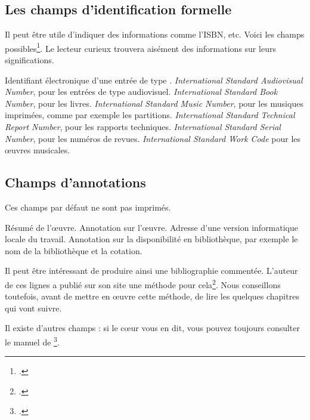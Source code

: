 \subsection{Les champs d'identification formelle}

Il peut être utile d'indiquer des informations comme l'ISBN, etc. Voici les champs possibles\footcite[Par défaut,  imprime ces champs s'ils sont remplis. Il est toutefois possible de ne pas les afficher en passant l'option  au chargement du package, voir:][]{biblatex_isbn}.  Le lecteur curieux trouvera aisément des informations sur leurs significations.

\begin{fieldlist}
	 Identifiant électronique d'une entrée de type . 
   	 \emph{\textenglish{International Standard Audiovisual Number}}, pour les entrées de type audiovisuel.
   	 \emph{\textenglish{International Standard Book Number}}, pour les livres. 
   	 \emph{\textenglish{International Standard Music Number}}, pour les musiques imprimées, comme par exemple les partitions. 
   	 \emph{\textenglish{International Standard Technical Report Number}}, pour les rapports techniques. 
   	 \emph{\textenglish{International Standard Serial Number}}, pour les numéros de revues. 
   	 \emph{\textenglish{International Standard Work Code}} pour les œuvres musicales.
\end{fieldlist}

\subsection{Champs d'annotations}

Ces champs par défaut ne sont pas imprimés. 

\begin{fieldlist}
	 Résumé de l'œuvre. 
   	 Annotation sur l'œuvre.
   	 Adresse d'une version informatique locale du travail. 
   	 Annotation sur la disponibilité en bibliothèque, par exemple  le nom de la bibliothèque et la cotation.
	
\end{fieldlist}

\begin{plusloins}
Il peut être intéressant de produire ainsi une bibliographie commentée. L'auteur de ces lignes a publié sur son site une méthode pour cela\footcite{biblio_commentee}. Nous conseillons toutefois, avant de mettre en œuvre cette méthode, de lire les quelques chapitres qui vont suivre.
\end{plusloins}

Il existe d'autres champs : si le cœur vous en dit, vous pouvez toujours consulter le manuel de \footcite{biblatex_champs}.
